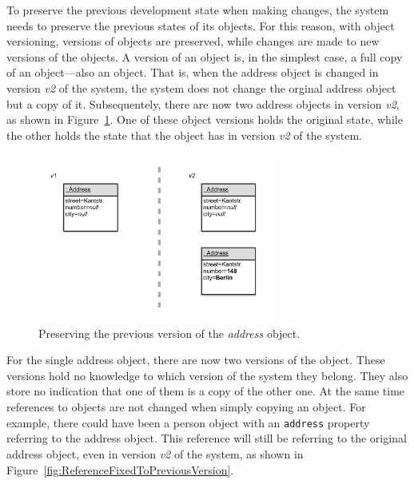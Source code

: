 To preserve the previous development state when making changes, the system needs to preserve the previous states of its objects.
For this reason, with object versioning, versions of objects are preserved, while changes are made to new versions of the objects.
A version of an object is, in the simplest case, a full copy of an object---also an object.
That is, when the address object is changed in version \emph{v2} of the system, the system does not change the orginal address object but a copy of it.
Subsequentely, there are now two address objects in version \emph{v2}, as shown in Figure~\ref{fig:VersionPreserved}.
One of these object versions holds the original state, while the other holds the state that the object has in version \emph{v2} of the system.

\begin{figure}[h]
    \centering
    \includegraphics[width=0.7\textwidth]{figures/4_approach/3_previousVersionPreserved.pdf}
    \caption{Preserving the previous version of the \emph{address} object.}
    \label{fig:VersionPreserved}
\end{figure}

For the single address object, there are now two versions of the object.
These versions hold no knowledge to which version of the system they belong.
They also store no indication that one of them is a copy of the other one.
At the same time references to objects are not changed when simply copying an object.
For example, there could have been a person object with an \lstinline{address} property referring to the address object.
This reference will still be referring to the original address object, even in version \emph{v2} of the system, as shown in Figure~\ref{fig:ReferenceFixedToPreviousVersion}.

